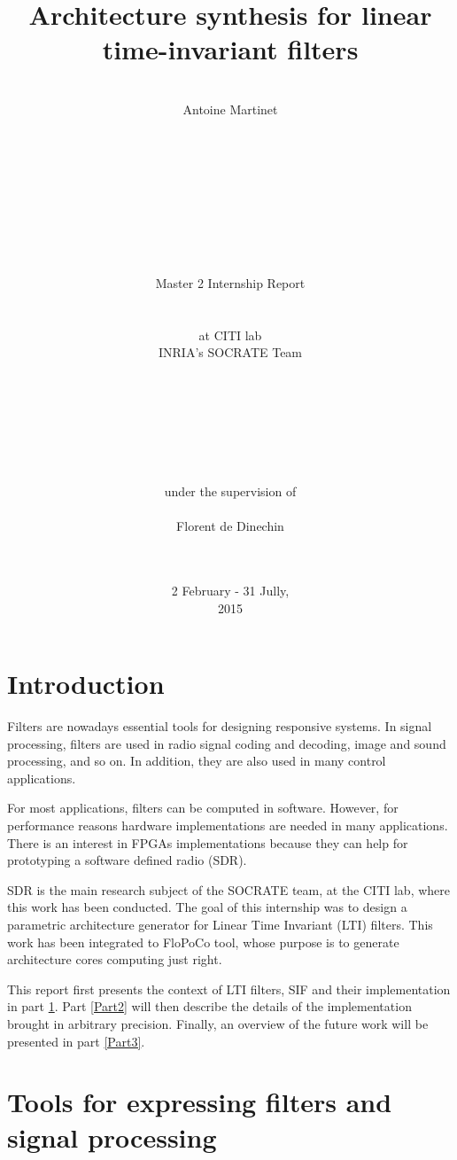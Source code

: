 \documentclass[twoside]{article}
\title{Architecture synthesis for linear time-invariant filters}
\author{\\ \Large Antoine Martinet \\ \\\\\\\\\\\\\\ \\ \\ Master 2 Internship Report \\ \\ \\ \LARGE at CITI lab \\ INRIA's SOCRATE Team \\\\\\\\\\\\\\\\ \normalsize under the supervision of\\ \\ \Large Florent de Dinechin \\ \\ \\}
\date{2 February - 31 Jully, \\ \vspace{5pt} 2015}
\theoremstyle{remark}
\numberwithin{equation}{subsection}
\newcommand{\TODO}{\textbf{TODO}}
\begin{document}
\maketitle
\newpage
\tableofcontents
\newpage

\section*{ Introduction }

	Filters are nowadays essential tools for designing responsive systems.
	In signal processing, filters are used in
	radio signal coding and decoding, image and sound processing, and so on.
	In addition, they are also used in many control applications.



	For most applications, filters can be computed in software.
	However, for performance reasons hardware implementations are needed in many applications.
	There is an interest in FPGAs implementations because they can help for prototyping a software defined radio (SDR).

	
	SDR is the main research subject of the SOCRATE team, at the CITI lab, where this work has been conducted.
	The goal of this internship was to design a parametric architecture generator for Linear Time Invariant (LTI) filters.
	This work has been integrated to FloPoCo tool,
	whose purpose is to generate architecture cores computing just right.


	This report first presents the context of LTI filters, SIF and their implementation in part \ref{Part1}.
	Part \ref{Part2} will then describe the details of the implementation brought in arbitrary precision.
	Finally, an overview of the future work will be presented in part \ref{Part3}.

\section{Tools for expressing filters and signal processing}
\label{Part1}

\end{document}
